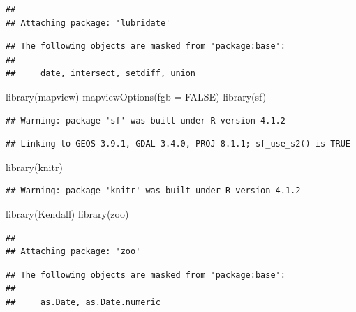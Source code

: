 \documentclass[
  12pt,
]{article}
\newenvironment{Shaded}{\begin{snugshade}}{\end{snugshade}}
\newcommand{\AttributeTok}[1]{\textcolor[rgb]{0.77,0.63,0.00}{#1}}
\newcommand{\ConstantTok}[1]{\textcolor[rgb]{0.00,0.00,0.00}{#1}}
\newcommand{\FunctionTok}[1]{\textcolor[rgb]{0.00,0.00,0.00}{#1}}
\newcommand{\NormalTok}[1]{#1}
\begin{document}
\begin{verbatim}
## 
## Attaching package: 'lubridate'
\end{verbatim}

\begin{verbatim}
## The following objects are masked from 'package:base':
## 
##     date, intersect, setdiff, union
\end{verbatim}

\begin{Shaded}
\begin{Highlighting}[]
\FunctionTok{library}\NormalTok{(mapview)}
\FunctionTok{mapviewOptions}\NormalTok{(}\AttributeTok{fgb =} \ConstantTok{FALSE}\NormalTok{)}
\FunctionTok{library}\NormalTok{(sf)}
\end{Highlighting}
\end{Shaded}

\begin{verbatim}
## Warning: package 'sf' was built under R version 4.1.2
\end{verbatim}

\begin{verbatim}
## Linking to GEOS 3.9.1, GDAL 3.4.0, PROJ 8.1.1; sf_use_s2() is TRUE
\end{verbatim}

\begin{Shaded}
\begin{Highlighting}[]
\FunctionTok{library}\NormalTok{(knitr)}
\end{Highlighting}
\end{Shaded}

\begin{verbatim}
## Warning: package 'knitr' was built under R version 4.1.2
\end{verbatim}

\begin{Shaded}
\begin{Highlighting}[]
\FunctionTok{library}\NormalTok{(Kendall)}
\FunctionTok{library}\NormalTok{(zoo)}
\end{Highlighting}
\end{Shaded}

\begin{verbatim}
## 
## Attaching package: 'zoo'
\end{verbatim}

\begin{verbatim}
## The following objects are masked from 'package:base':
## 
##     as.Date, as.Date.numeric
\end{verbatim}
\end{document}
